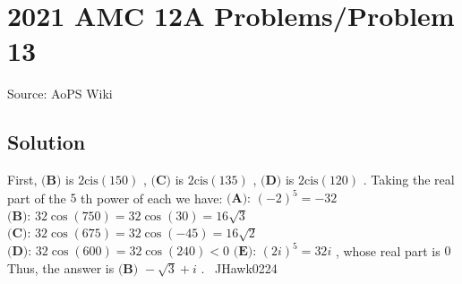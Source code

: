 \documentclass[12pt]{article}
\begin{document}
\section*{{2021 AMC 12A Problems/Problem 13}}
Source: AoPS Wiki

\subsection*{Solution}
First, $\textbf{(B)}$ is $2\text{cis}(150)$ , $\textbf{(C)}$ is $2\text{cis}(135)$ , $\textbf{(D)}$ is $2\text{cis}(120)$ . Taking the real part of the $5$ th power of each we have: $\textbf{(A): }(-2)^5=-32$ $\textbf{(B): }32\cos(750)=32\cos(30)=16\sqrt{3}$ $\textbf{(C): }32\cos(675)=32\cos(-45)=16\sqrt{2}$ $\textbf{(D): }32\cos(600)=32\cos(240)<0$ $\textbf{(E): }(2i)^5=32i$ , whose real part is $0$ Thus, the answer is $\boxed{\textbf{(B) }{-}\sqrt3+i}$ . ~JHawk0224
\end{document}
